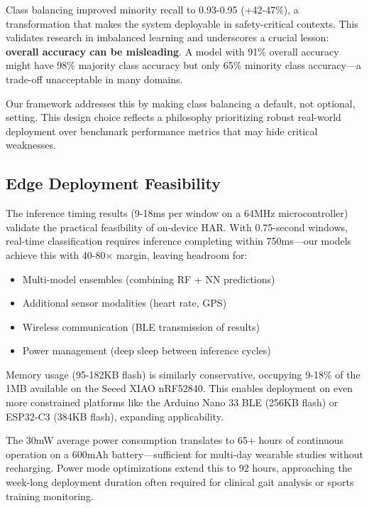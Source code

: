 Class balancing improved minority recall to 0.93-0.95 (+42-47\%), a transformation that makes the system deployable in safety-critical contexts. This validates research in imbalanced learning \cite{he2009learning, chawla2002smote} and underscores a crucial lesson: \textbf{overall accuracy can be misleading}. A model with 91\% overall accuracy might have 98\% majority class accuracy but only 65\% minority class accuracy—a trade-off unacceptable in many domains.

Our framework addresses this by making class balancing a default, not optional, setting. This design choice reflects a philosophy prioritizing robust real-world deployment over benchmark performance metrics that may hide critical weaknesses.

\subsection{Edge Deployment Feasibility}
The inference timing results (9-18ms per window on a 64MHz microcontroller) validate the practical feasibility of on-device HAR. With 0.75-second windows, real-time classification requires inference completing within 750ms—our models achieve this with 40-80× margin, leaving headroom for:
\begin{itemize}
    \item Multi-model ensembles (combining RF + NN predictions)
    \item Additional sensor modalities (heart rate, GPS)
    \item Wireless communication (BLE transmission of results)
    \item Power management (deep sleep between inference cycles)
\end{itemize}

Memory usage (95-182KB flash) is similarly conservative, occupying 9-18\% of the 1MB available on the Seeed XIAO nRF52840. This enables deployment on even more constrained platforms like the Arduino Nano 33 BLE (256KB flash) or ESP32-C3 (384KB flash), expanding applicability.

The 30mW average power consumption translates to 65+ hours of continuous operation on a 600mAh battery—sufficient for multi-day wearable studies without recharging. Power mode optimizations extend this to 92 hours, approaching the week-long deployment duration often required for clinical gait analysis or sports training monitoring.

